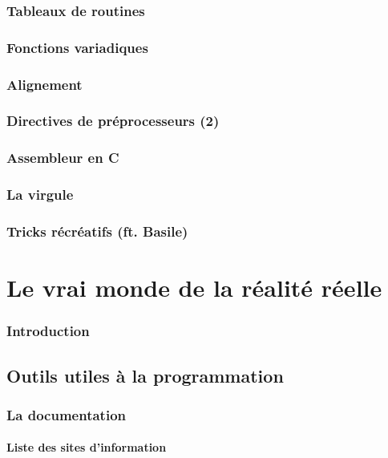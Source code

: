 \documentclass{minitelreport}
\begin{document}
\begin{refsection}
		\section{Tableaux de routines}
		
		\section{Fonctions variadiques}
		
		\section{Alignement}
		
		\section{Directives de préprocesseurs (2)}
		
		\section{Assembleur en C}
		
		\section{La virgule}
		
		\section{Tricks récréatifs (ft. Basile)}
		
\part{Le vrai monde de la réalité réelle}
	\section*{Introduction}
	
	\chapter{Outils utiles à la programmation}
		\section{La documentation}
			\subsection{Liste des sites d'information}

\end{refsection}
\end{document}

